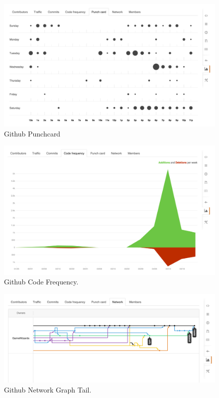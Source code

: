 \documentclass[12pt]{article}
\begin{document}
\begin{figure}[H]
        \centering
        \includegraphics[width=4.5in]{punchcard.png}
        \caption{Github Punchcard}
\end{figure}
    
\begin{figure}[H]
        \centering
        \includegraphics[width=4.5in]{codefrequency.png}
        \caption{Github Code Frequency.}\label{code:freq}
\end{figure}

\begin{figure}[H]
        \centering
        \includegraphics[width=4.5in]{networkgraph.png}
        \caption{Github Network Graph Tail.}\label{code:graph}
\end{figure}
\end{document}
